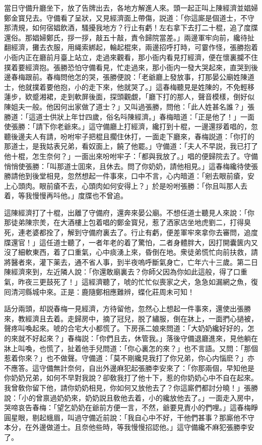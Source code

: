 當日守備升廳坐下，放了告牌出去，各地方解進人來。頭一起正叫上陳經濟並娼婦鄭金寳兒去。守備看了呈狀，又見經濟面上帶傷，説道：「你這廝是個道士，不守那清規，如何宿娼飲酒，騷擾我地方？行止有虧！左右拿下去打二十棍，追了度牒還俗。那娼婦鄭氏，拶一拶，敲五十敲，責令歸院當差。」兩邊軍牢向前，纔待扯翻經濟，攤去衣服，用䋲索綁起，輪起棍來，兩邊招呼打時，可霎作怪，張勝抱着小衙内正在廳前月臺上站立，走過來觀看，那小衙内看見打經濟，便在懷裏攔不住撲着要經濟抱。張勝恐怕守備看見，忙走過來，那小衙内一發大哭起來，直哭到後邊春梅跟前。春梅問他怎的哭，張勝便說：「老爺廳上發放事，打那晏公廟姓陳道士，他就撲着要他抱，小的走下來，他就哭了。」這春梅聽見是姓陳的，不免輕移蓮步，欵蹙湘裙，走到軟屏後面，探頭觀覷，「廳下打的那人，聲音模樣，倒好似陳姐夫一般。他因何出家做了道士？」又叫過張勝，問他：「此人姓甚名誰？」張勝道：「這道士供狀上年廿四歲，俗名呌陳經濟。」春梅暗道：「正是他了！」一面使張勝：「請下你老爺來。」這守備廳上打經濟，纔打到十棍，一邊還拶着唱的，忽聽後邊夫人有請，吩咐牢子把棍且擱住休打，一面走下廳來，春梅説道：「你打的那道士，是我姑表兄弟，看奴面上，饒了他罷。」守備道：「夫人不早説，我已打了他十棍，怎生奈何？」一面出來吩咐牢子：「都與我放了。」唱的便歸院去了。守備悄悄使張勝：「叫那道士囬來，且休去。問了你奶奶，請他相見。」這春梅纔待使張勝請他到後堂相見，忽然想起一件事來，口中不言，心内暗道：「剜去眼前瘡，安上心頭肉。眼前瘡不去，心頭肉如何安得上？」於是吩咐張勝：「你且叫那人去着，等我慢慢再呌他。」度牒也不曾追。

這陳經濟打了十棍，出離了守備府，還奔來晏公廟。不想任道士聽見人來說：「你那徒弟陳宗羙，在大酒樓上包着唱的鄭金寳兒，惹了洒家店坐地虎劉二，打得臭死，連老婆都拴了，解到守備府裏去了。行止有虧，便差軍牢來拿你去審問，追度牒還官！」這任道士聽了，一者年老的着了驚怕，二者身體胖大，因打開囊篋内又沒了細軟東西，着了口重氣，心中痰湧上來，昏倒在地。衆徒弟慌忙向前扶救，請將醫者來，灌下薬去，通不省人事，到半夜嗚呼斷氣身亡，亡年六十三歲。第二日陳經濟來到，左近隣人說：「你還敢廟裏去？你師父因為你如此這般，得了口重氣，昨夜三更鼓死了！」這經濟聽了，唬的忙忙似喪家之犬，急急如漏網之魚，復囘清河縣城中來。正是：鹿隨鄭相應難辨，蝶化莊周未可知！

話分兩頭，却説春梅一見經濟，方待留他，忽然心上想起一件事來，還使出張勝來，教經濟且去着。走歸房中，摘了冠兒，脱了繡服，倒在牀上，一面捫心撾被，聲疼叫喚起來。唬的合宅大小都慌了。下房孫二娘來問道：「大奶奶纔好好的，怎的來就不好起來？」春梅説：「你們且去，休管我。」落後守備退廳進來，見他躺在牀上叫喚，也慌了，扯着他手兒問道：「你心裏怎的來？」也不言語。又問：「那個惹着你來？」也不做聲。守備道：「莫不剛纔見我打了你兄弟，你心内惱麽？」亦不應答。這守備無計奈何，自出外邊麻犯起張勝李安來了：「你那兩個，早知他是你奶奶兄弟，如何不早對我說？卻敎我打了他十下，惹的你奶奶心中不自在起來。我曾敎你留下他，請你奶奶相見，你如何又放他去了？你這廝們都討分曉！」張勝說：「小的曾禀過奶奶來，奶奶説且敎他去着，小的纔放他去了。」一面走入房中，哭啼哀告春梅：「望乞奶奶在爺前方便一言，不然，爺要見責小的們哩。」這春梅睜圓星眼，剔起蛾眉，叫過守備近前說：「我自心中不好，干他們甚事？那廝他不守本分，在外邊做道士。且奈他些時，等我慢慢招認他。」這守備纔不麻犯張勝李安了。

